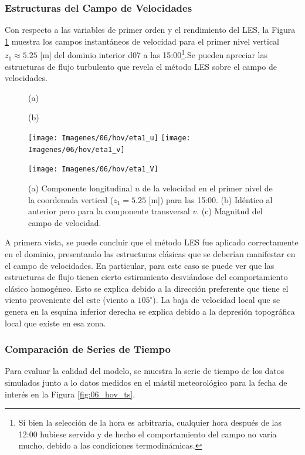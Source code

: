 \subsubsection{Estructuras del Campo de Velocidades}
Con respecto a las variables de primer orden y el rendimiento del LES, la Figura \ref{fig:06_hov_eta1} muestra los campos instantáneos de velocidad para el primer nivel vertical $z_1\approx 5.25$ [m] del dominio interior d07 a las 15:00\footnote{Si bien la selección de la hora es arbitraria, cualquier hora después de las 12:00 hubiese servido y de hecho el comportamiento del campo no varía mucho, debido a las condiciones termodinámicas.}.Se pueden apreciar las estructuras de flujo turbulento que revela el método LES sobre el campo de velocidades. 
\begin{figure}[H]
	\centering
	\begin{minipage}{0.5\linewidth}
		\center\hspace{0.3cm}(a)
	\end{minipage}%
	\begin{minipage}{0.5\linewidth}
		\center\hspace{0.3cm}(b)
	\end{minipage}%
	
	\texttt{[image: Imagenes/06/hov/eta1\_u]}%
	\texttt{[image: Imagenes/06/hov/eta1\_v]}%
	
	
	\texttt{[image: Imagenes/06/hov/eta1\_V]}%
	\caption{(a) Componente longitudinal $u$ de la velocidad en el primer nivel de la coordenada vertical ($z_1=5.25$ [m]) para las 15:00. (b) Idéntico al anterior pero para la componente transversal $v$. (c) Magnitud del campo de velocidad.}
	\label{fig:06_hov_eta1}
\end{figure}
A primera vista, se puede concluir que el método LES fue aplicado correctamente en el dominio, presentando las estructuras clásicas que se deberían manifestar en el campo de velocidades. En particular, para este caso se puede ver que las estructuras de flujo tienen cierto estiramiento desviándose del comportamiento clásico homogéneo. Esto se explica debido a la dirección preferente que tiene el viento proveniente del este (viento a $105^\circ$). La baja de velocidad local que se genera en la esquina inferior derecha se explica debido a la depresión topográfica local que existe en esa zona.
\subsubsection{Comparación de Series de Tiempo}
Para evaluar la calidad del modelo, se muestra la serie de tiempo de los datos simulados junto a lo datos medidos en el mástil meteorológico para la fecha de interés en la Figura \ref{fig:06_hov_ts}. 

